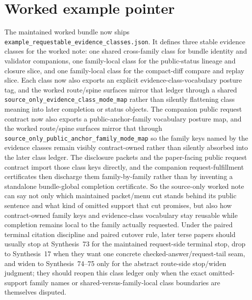 \documentclass[11pt]{article}
\begin{document}
\section{Worked example pointer}
The maintained worked bundle now ships \nolinkurl{example_requestable_evidence_classes.json}.\cite{series:workedexample}
It defines three stable evidence classes for the worked note: one shared cross-family class for bundle identity and validator companions, one family-local class for the public-status lineage and closure slice, and one family-local class for the compact-diff compare and replay slice. Each class now also exports an explicit evidence-class-vocabulary posture tag, and the worked route/spine surfaces mirror that ledger through a shared \nolinkurl{source_only_evidence_class_mode_map} rather than silently flattening class meaning into later completion or status objects. The companion public request contract now also exports a public-anchor-family vocabulary posture map, and the worked route/spine surfaces mirror that through \nolinkurl{source_only_public_anchor_family_mode_map} so the family keys named by the evidence classes remain visibly contract-owned rather than silently absorbed into the later class ledger.
The disclosure packets and the paper-facing public request contract import those class keys directly, and the companion request-fulfillment certificates then discharge them family-by-family rather than by inventing a standalone bundle-global completion certificate.\cite{series:requestfulfillmentcertificates}
So the source-only worked note can say not only which maintained packet/menu cut stands behind its public sentence and what kind of omitted support that cut promises, but also how contract-owned family keys and evidence-class vocabulary stay reusable while completion remains local to the family actually requested. Under the paired terminal citation discipline and paired cutover rule, later terse papers should usually stop at Synthesis~73 for the maintained request-side terminal stop, drop to Synthesis~17 when they want one concrete checked-answer/request-tail seam, and widen to Synthesis~74--75 only for the abstract route-side stop/widen judgment; they should reopen this class ledger only when the exact omitted-support family names or shared-versus-family-local class boundaries are themselves disputed.\cite{series:requestsideterminalcitationnormalform,series:pairedterminalcitationdiscipline,series:pairedterminalcutoverrules}
\end{document}
